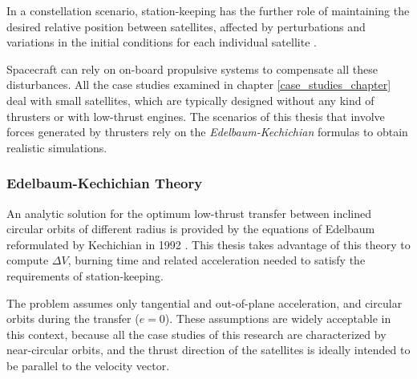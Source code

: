 In a constellation scenario, station-keeping has the further role of maintaining the desired relative position between satellites, affected by perturbations and variations in the initial conditions for each individual satellite \cite{wertz2009orbit}.

Spacecraft can rely on on-board propulsive systems to compensate all these disturbances.
All the case studies examined in chapter \ref{case_studies_chapter} deal with small satellites, which are typically designed without any kind of thrusters or with low-thrust engines.  
The scenarios of this thesis that involve forces generated by thrusters rely on the \textit{Edelbaum-Kechichian} formulas to obtain realistic simulations.

\subsubsection{Edelbaum-Kechichian Theory}
An analytic solution for the optimum low-thrust transfer between inclined circular orbits of different radius is provided by the equations of Edelbaum reformulated by Kechichian in 1992 \cite{edelbaum1961propulsion, kechichian1992reformulation}.
This thesis takes advantage of this theory to compute $\Delta V$, burning time and related acceleration needed to satisfy the requirements of station-keeping.

The problem assumes only tangential and out-of-plane acceleration, and circular orbits during the transfer ($e = 0$).
These assumptions are widely acceptable in this context, because all the case studies of this research are characterized by near-circular orbits, and the thrust direction of the satellites is ideally intended to be parallel to the velocity vector.

